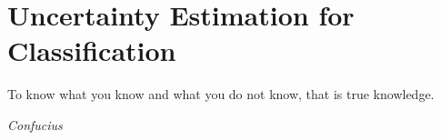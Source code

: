 \chapter{Uncertainty Estimation for Classification}
\label{chap:classification}

\epigraph{To know what you know and what you do not know, that is true knowledge.}{\textit{Confucius}}







